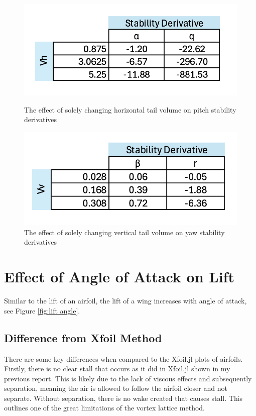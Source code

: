 \documentclass{article}
\begin{document}
\begin{figure}[h]
    \centering
\begin{minipage}[b]{0.45\textwidth}
\centering
\includegraphics[width=\textwidth]{Pitch Chart.png}
\caption{The effect of solely changing horizontal tail volume on pitch stability derivatives}
\label{fig:Pitch Chart}
\end{minipage}
\begin{minipage}[b]{0.45\textwidth}
\centering
\includegraphics[width=\textwidth]{Yaw Chart.png}
\caption{The effect of solely changing vertical tail volume on yaw stability derivatives}
\label{fig:Yaw Chart}
\end{minipage}
\end{figure}

\section{Effect of Angle of Attack on Lift}

Similar to the lift of an airfoil, the lift of a wing increases with angle of attack, see Figure \ref{fig:lift angle}. 

\subsection{Difference from Xfoil Method}

There are some key differences when compared to the Xfoil.jl plots of airfoils. Firstly, there is no clear stall that occurs as it did in Xfoil.jl shown in my previous report. This is likely due to the lack of viscous effects and subsequently separation, meaning the air is allowed to follow the airfoil closer and not separate. Without separation, there is no wake created that causes stall. This outlines one of the great limitations of the vortex lattice method. 
\end{document}
